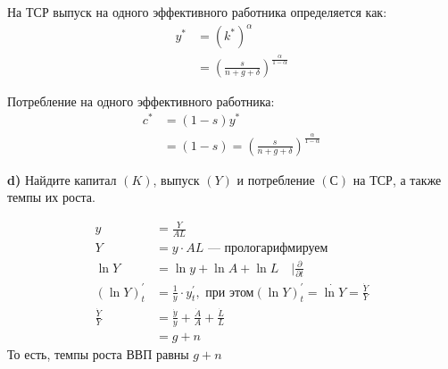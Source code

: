 \documentclass[a4paper, 10pt]{article}
\begin{document}
На ТСР выпуск на одного эффективного работника определяется как:
\begin{equation*}
    \begin{aligned}
        y^{*}&=(k^{*})^{\alpha}\\
        &=\left(\frac{s}{n+g+\delta}\right)^{\frac{\alpha}{1-\alpha}}
    \end{aligned}
\end{equation*}

Потребление на одного эффективного работника:
\begin{equation*}
    \begin{aligned}
        c^{*}&=(1-s)y^{*}\\
        &=(1-s)=\left(\frac{s}{n+g+\delta}\right)^{\frac{\alpha}{1-\alpha}}
    \end{aligned}
\end{equation*}

\begin{tcolorbox}[colback=blue!20!white, colframe=black!100!black]
    \textbf{d)} Найдите капитал $(K)$, выпуск $(Y)$ и потребление $(С)$ на ТСР, а также темпы их роста.
\end{tcolorbox}

\begin{equation*}
    \begin{aligned}
        y&=\frac{Y}{AL}\\
        Y&=y\cdot AL\text{ — прологарифмируем}\\
        \ln Y&=\ln y+\ln A+\ln L\quad\vert\frac{\partial }{\partial t}\\
        \left(\ln Y\right)^{\prime}_t&=\frac{1}{y}\cdot y^{\prime}_t,\text{ при этом} \left(\ln Y\right)^{\prime}_t=\dot{\ln Y}=\frac{\dot{Y}}{Y}\\
        \frac{\dot{Y}}{Y}&=\frac{\dot{y}}{y}+\frac{\dot{A}}{A}+\frac{\dot{L}}{L}\\
        &=g+n
    \end{aligned}
\end{equation*}
То есть, темпы роста ВВП равны $g+n$
\end{document}
